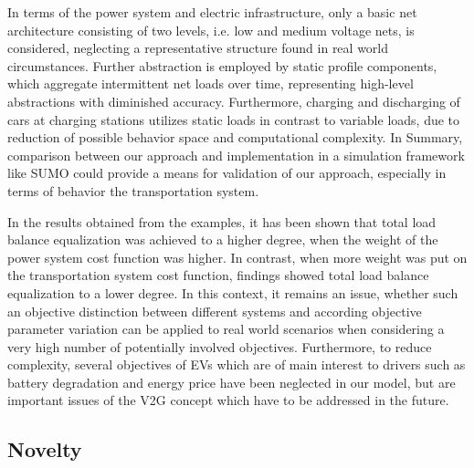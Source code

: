 In terms of the power system and electric infrastructure, only a basic net architecture consisting of two levels, i.e. low and medium voltage nets, is considered, neglecting a representative structure found in real world circumstances. Further abstraction is employed by static profile components, which aggregate intermittent net loads over time, representing high-level abstractions with diminished accuracy. Furthermore, charging and discharging of cars at charging stations utilizes static loads in contrast to variable loads, due to reduction of possible behavior space and computational complexity. In Summary, comparison between our approach and implementation in a simulation framework like SUMO could provide a means for validation of our approach, especially in terms of behavior the transportation system.

In the results obtained from the examples, it has been shown that total load balance equalization was achieved to a higher degree, when the weight of the power system cost function was higher. In contrast, when more weight was put on the transportation system cost function, findings showed total load balance equalization to a lower degree. In this context, it remains an issue, whether such an objective distinction between different systems and according objective parameter variation can be applied to real world scenarios when considering a very high number of potentially involved objectives. Furthermore, to reduce complexity, several objectives of EVs which are of main interest to drivers such as battery degradation and energy price have been neglected in our model, but are important issues of the V2G concept which have to be addressed in the future.


\subsection{Novelty}


